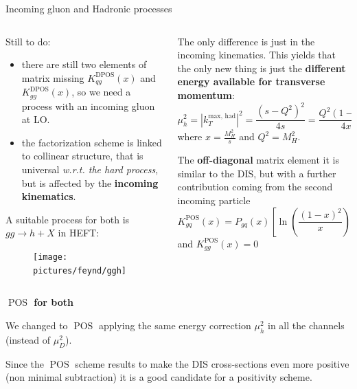 \documentclass[8pt]{beamer}
\DeclareMathOperator{\pos}{POS}
\DeclareMathOperator{\dpos}{DPOS}
\begin{document}
\begin{frame}{Incoming gluon and Hadronic processes}
    \begin{columns}
        \begin{column}{0.5\textwidth}
            Still to do:
            \begin{itemize}
                \item there are still two elements of matrix missing
                    $K_{qg}^{\dpos}(x)$ and $K_{gg}^{\dpos}(x)$, so we need a
                    process with an incoming gluon at LO.

                \item the factorization scheme is linked to collinear
                    structure, that is universal \textit{w.r.t. the hard
                    process}, but is affected by the \textbf{incoming
                kinematics}.
            \end{itemize}

            \vspace*{8pt}
            A suitable process for both is $gg\to h + X$ in HEFT:
            \begin{figure}
              \texttt{[image: pictures/feynd/ggh]}
            \end{figure}
        \end{column}
        \begin{column}{0.5\textwidth}
            The only difference is just in the incoming kinematics\footnotemark.
            This yields that the only new thing is just the \textbf{different energy available
            for transverse momentum}:
            \begin{equation*}\label{eq:ktmaxh}
                \mu_h^2=  |k_T^\text{max, had}|^2=\frac{(s-Q^2)^2}{4s}=\frac{Q^2(1-x)^2}{4x}
            \end{equation*}
            where $x=\frac{M_H^2}{s}$ and $ Q^2 = M_H^2 $.

            \vspace*{10pt}
            The \textbf{off-diagonal} matrix element it is similar to the DIS, but
            with a further contribution coming from the second incoming particle
            \begin{equation*}
                K_{gq}^{\pos} (x) =
                P_{gq}(x)\left[\ln\left(\frac{(1-x)^2}{x}\right) - 1\right]
            \end{equation*}
            and $K_{gg}^{\pos} (x) = 0$
        \end{column}
    \end{columns}

    \vspace*{15pt}
    \textbf{\large $\pos$ for both}
    
    We changed to $\pos$ applying the same energy correction $\mu_h^2$ in all
    the channels (instead of $\mu_D^2$).

    Since the $\pos$ scheme results to make the DIS cross-sections even more
    positive (non minimal subtraction) it is a good candidate for a positivity
    scheme.
\end{frame}
\end{document}
